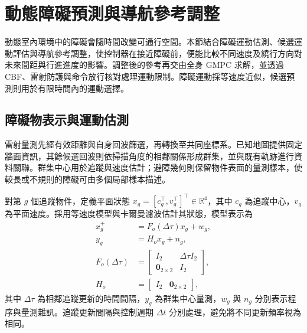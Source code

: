 
\section{動態障礙預測與導航參考調整}
\label{sec:dynamic_obstacle_avoidance}

動態室內環境中的障礙會隨時間改變可通行空間。本節結合障礙運動估測、候選運動評估與導航參考調整，使控制器在接近障礙前，便能比較不同速度及繞行方向對未來間距與行進進度的影響。調整後的參考再交由全身 GMPC 求解，並透過 CBF、雷射防護與命令放行核對處理運動限制。障礙運動採等速度近似，候選預測則用於有限時間內的運動選擇。

\subsection{障礙物表示與運動估測}
\label{subsec:obstacle_representation_prediction}

雷射量測先經有效距離與自身回波篩選，再轉換至共同座標系。已知地圖提供固定牆面資訊，其餘候選回波則依掃描角度的相鄰關係形成群集，並與既有軌跡進行資料關聯。群集中心用於追蹤與速度估計；避障幾何則保留物件表面的量測樣本，使較長或不規則的障礙可由多個局部樣本描述。

對第 $g$ 個追蹤物件，定義平面狀態 $x_g=[c_g^{\top},v_g^{\top}]^{\top}\in\mathbb{R}^{4}$，其中 $c_g$ 為追蹤中心，$v_g$ 為平面速度。採用等速度模型與卡爾曼濾波\cite{kalman1960filter}估計其狀態，模型表示為
\begin{equation}
    \begin{aligned}
        x_g^{+}
        &=F_o(\Delta\tau)x_g+w_g, \\
        y_g
        &=H_o x_g+n_g, \\
        F_o(\Delta\tau)
        &=\begin{bmatrix}
            I_2 & \Delta\tau I_2 \\
            \mathbf{0}_{2\times2} & I_2
          \end{bmatrix}, \\
        H_o
        &=\begin{bmatrix}
            I_2 & \mathbf{0}_{2\times2}
          \end{bmatrix},
    \end{aligned}
    \label{eq:ch3_obstacle_tracking_model}
\end{equation}
其中 $\Delta\tau$ 為相鄰追蹤更新的時間間隔，$y_g$ 為群集中心量測，$w_g$ 與 $n_g$ 分別表示程序與量測雜訊。追蹤更新間隔與控制週期 $\Delta t$ 分別處理，避免將不同更新頻率視為相同。

